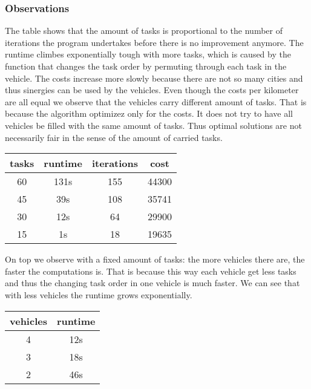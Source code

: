 \documentclass[11pt]{article}
\begin{document}
\subsubsection{Observations}
The table shows that the amount of tasks is proportional to the number of iterations the program undertakes before there is no improvement anymore. The runtime climbes exponentially tough with more tasks, which is caused by the function that changes the task order by permuting through each task in the vehicle. The costs increase more slowly because there are not so many cities and thus sinergies can be used by the vehicles.
Even though the costs per kilometer are all equal we observe that the vehicles carry different amount of tasks. That is because the algorithm optimizez only for the costs. It does not try to have all vehicles be filled with the same amount of tasks. Thus optimal solutions are not necessarily fair in the sense of the amount of carried tasks. 
\begin{tabular}{ c  |c c c }

 tasks & runtime & iterations&cost  \\ 
\hline
 60 & 131s &155 &44300 \\  
 45 & 39s &108 &35741\\
 30 & 12s &64& 29900\\
 15&1s&18&19635
\end{tabular}

On top we observe with a fixed amount of tasks: the more vehicles there are, the faster the computations is. That is because this way each vehicle get less tasks and thus the changing task order in one vehicle is much faster. We can see that with less vehicles the runtime grows exponentially.
\begin{tabular}{ c  |c  }

 vehicles & runtime  \\ 
\hline
 4 & 12s  \\  
 3 & 18s \\
 2 & 46s \\
\end{tabular}
\end{document}
